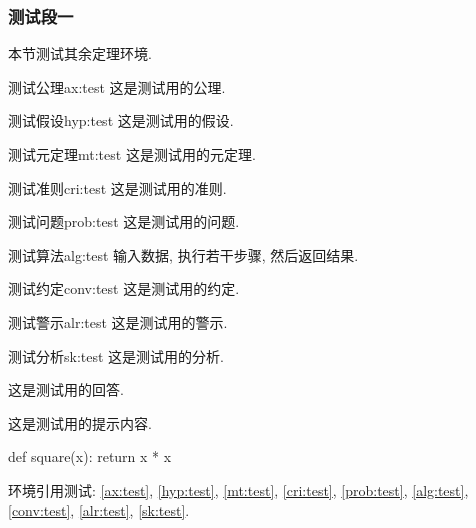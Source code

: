 \subsubsection{测试段一}

本节测试其余定理环境.

\begin{axiom}{测试公理}{ax:test}
    这是测试用的公理.
\end{axiom}

\begin{hypothesis}{测试假设}{hyp:test}
    这是测试用的假设.
\end{hypothesis}

\begin{metatheorem}{测试元定理}{mt:test}
    这是测试用的元定理.
\end{metatheorem}

\begin{criteria}{测试准则}{cri:test}
    这是测试用的准则.
\end{criteria}

\begin{problem}{测试问题}{prob:test}
    这是测试用的问题.
\end{problem}

\begin{algorithm}{测试算法}{alg:test}
    输入数据, 执行若干步骤, 然后返回结果.
\end{algorithm}

\begin{convention}{测试约定}{conv:test}
    这是测试用的约定.
\end{convention}

\begin{alarm}{测试警示}{alr:test}
    这是测试用的警示.
\end{alarm}

\begin{sketch}{测试分析}{sk:test}
    这是测试用的分析.
\end{sketch}

\begin{answer}
    这是测试用的回答.
\end{answer}

\begin{hint}[测试提示]
    这是测试用的提示内容.
\end{hint}

\begin{code}[Python 测试]
def square(x):
    return x * x
\end{code}

环境引用测试: \autoref{ax:test}, \autoref{hyp:test}, \autoref{mt:test}, \autoref{cri:test}, \autoref{prob:test}, \autoref{alg:test}, \autoref{conv:test}, \autoref{alr:test}, \autoref{sk:test}.
